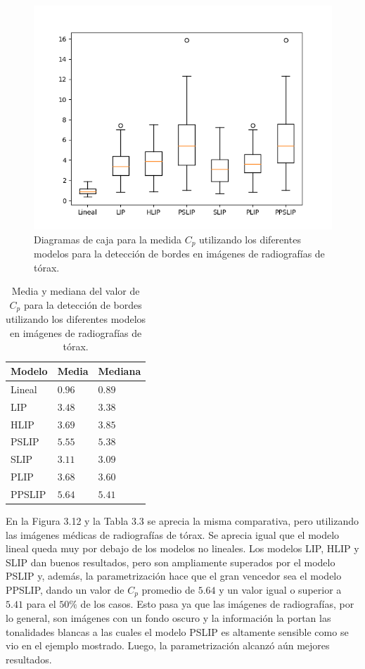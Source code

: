 \begin{figure}[h]
	\begin{center}
		\includegraphics[width=10.0 cm]{images/graphics/torax/ed/ed_all.png}
		\caption{Diagramas de caja para la medida $C_p$ utilizando los diferentes modelos para la detecci\'on de bordes en im\'agenes de radiograf\'ias de t\'orax.}
	\end{center}
\end{figure}

\begin{table}
	\begin{center}
		\begin{tabular}{|l|l|l|}
			\hline 
			Modelo & Media & Mediana\\
			\hline
			Lineal & $0.96$ & $0.89$\\
			\hline
			LIP & $3.48$ & $3.38$\\
			\hline
			HLIP & $3.69$ & $3.85$\\
			\hline
			PSLIP & $5.55$ & $5.38$\\
			\hline
			SLIP & $3.11$ & $3.09$\\
			\hline
			PLIP & $3.68$ & $3.60$\\
			\hline
			PPSLIP & $5.64$ & $5.41$\\
			\hline
		\end{tabular}
		\caption{Media y mediana del valor de $C_p$ para la detecci\'on de bordes utilizando los diferentes modelos en im\'agenes de radiograf\'ias de t\'orax.}
	\end{center}
\end{table}

En la Figura 3.12 y la Tabla 3.3 se aprecia la misma comparativa, pero utilizando las im\'agenes m\'edicas de radiograf\'ias de t\'orax. Se aprecia igual que el modelo lineal queda muy por debajo de los modelos no lineales. Los modelos LIP, HLIP y SLIP dan buenos resultados, pero son ampliamente superados por el modelo PSLIP y, adem\'as, la parametrizaci\'on hace que el gran vencedor sea el modelo PPSLIP, dando un valor de $C_p$ promedio de $5.64$ y un valor igual o superior a $5.41$ para el $50\%$  de los casos. Esto pasa ya que las im\'agenes de radiograf\'ias, por lo general, son im\'agenes con un fondo oscuro y la informaci\'on la portan las tonalidades blancas a las cuales el modelo PSLIP es altamente sensible como se vio en el ejemplo mostrado. Luego, la parametrizaci\'on alcanz\'o a\'un mejores resultados. 

